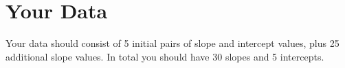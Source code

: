 \section{Your Data}
%
Your data should consist of 5 initial pairs of slope and intercept values, plus 25 additional slope values. In total you should have 30 slopes and 5 intercepts.
%
%
\newpage

